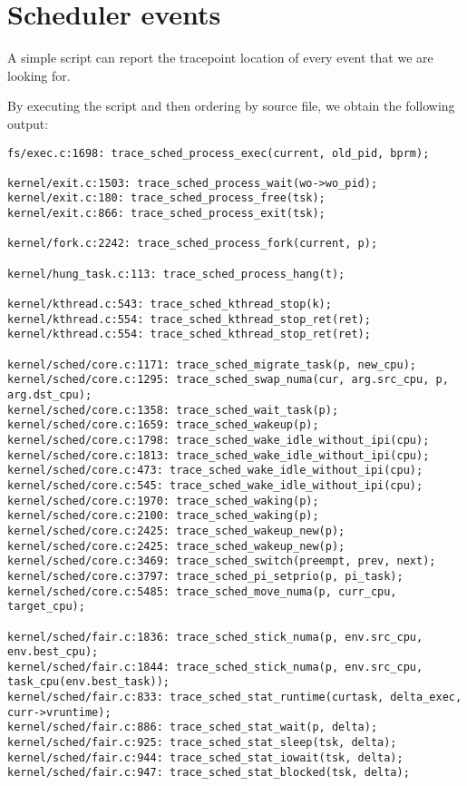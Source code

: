 \chapter{Scheduler events}
\label{ch:events_documentation}
A simple script can report the tracepoint location of every event that we are looking for.
By executing the script and then ordering by source file, we obtain the following output:

\begin{Verbatim}[xleftmargin=-0.5cm,fontsize=\footnotesize]
fs/exec.c:1698: trace_sched_process_exec(current, old_pid, bprm);

kernel/exit.c:1503: trace_sched_process_wait(wo->wo_pid);
kernel/exit.c:180: trace_sched_process_free(tsk);
kernel/exit.c:866: trace_sched_process_exit(tsk);

kernel/fork.c:2242: trace_sched_process_fork(current, p);

kernel/hung_task.c:113: trace_sched_process_hang(t);

kernel/kthread.c:543: trace_sched_kthread_stop(k);
kernel/kthread.c:554: trace_sched_kthread_stop_ret(ret);
kernel/kthread.c:554: trace_sched_kthread_stop_ret(ret);

kernel/sched/core.c:1171: trace_sched_migrate_task(p, new_cpu);
kernel/sched/core.c:1295: trace_sched_swap_numa(cur, arg.src_cpu, p, arg.dst_cpu);
kernel/sched/core.c:1358: trace_sched_wait_task(p);
kernel/sched/core.c:1659: trace_sched_wakeup(p);
kernel/sched/core.c:1798: trace_sched_wake_idle_without_ipi(cpu);
kernel/sched/core.c:1813: trace_sched_wake_idle_without_ipi(cpu);
kernel/sched/core.c:473: trace_sched_wake_idle_without_ipi(cpu);
kernel/sched/core.c:545: trace_sched_wake_idle_without_ipi(cpu);
kernel/sched/core.c:1970: trace_sched_waking(p);
kernel/sched/core.c:2100: trace_sched_waking(p);
kernel/sched/core.c:2425: trace_sched_wakeup_new(p);
kernel/sched/core.c:2425: trace_sched_wakeup_new(p);
kernel/sched/core.c:3469: trace_sched_switch(preempt, prev, next);
kernel/sched/core.c:3797: trace_sched_pi_setprio(p, pi_task);
kernel/sched/core.c:5485: trace_sched_move_numa(p, curr_cpu, target_cpu);

kernel/sched/fair.c:1836: trace_sched_stick_numa(p, env.src_cpu, env.best_cpu);
kernel/sched/fair.c:1844: trace_sched_stick_numa(p, env.src_cpu, task_cpu(env.best_task));
kernel/sched/fair.c:833: trace_sched_stat_runtime(curtask, delta_exec, curr->vruntime);
kernel/sched/fair.c:886: trace_sched_stat_wait(p, delta);
kernel/sched/fair.c:925: trace_sched_stat_sleep(tsk, delta);
kernel/sched/fair.c:944: trace_sched_stat_iowait(tsk, delta);
kernel/sched/fair.c:947: trace_sched_stat_blocked(tsk, delta);
\end{Verbatim}
